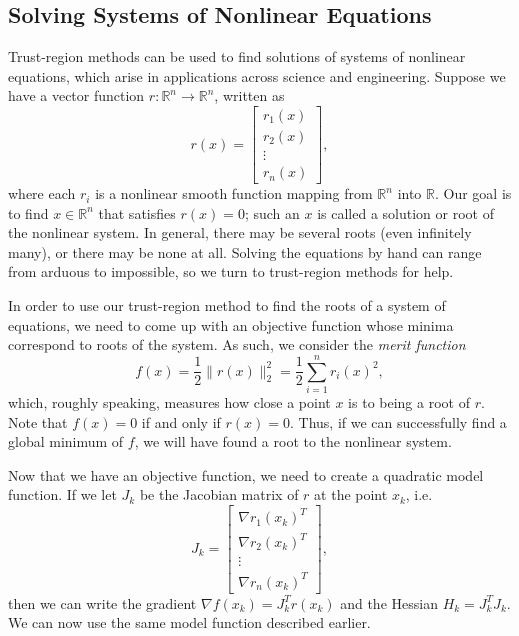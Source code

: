 \subsection*{Solving Systems of Nonlinear Equations}
Trust-region methods can be used to find solutions of systems of nonlinear equations, which arise in applications across science and engineering.
Suppose we have a vector function $r : \mathbb{R}^n \rightarrow \mathbb{R}^n$, written as
\[
r(x) = \begin{bmatrix}
r_1(x)\\
r_2(x)\\
\vdots\\
r_n(x)
\end{bmatrix},
\]
where each $r_i$ is a nonlinear smooth function mapping from $\mathbb{R}^n$ into $\mathbb{R}$.
Our goal is to find $x \in \mathbb{R}^n$ that satisfies $r(x) = 0$; such an $x$ is called a solution
or root of the nonlinear system. In general, there may be several roots (even infinitely many), or there
may be none at all. Solving the equations by hand can range from arduous to impossible, so we turn
to trust-region methods for help.

In order to use our trust-region method to find the roots of a system
of equations, we need to come up with an objective function whose minima correspond to roots of the
system. As such, we consider the \emph{merit function}
\[
f(x) = \frac{1}{2}\|r(x)\|_2^2 = \frac{1}{2}\sum_{i=1}^nr_i(x)^2,
\]
which, roughly speaking, measures how close a point $x$ is to being a root of $r$. Note that $f(x) = 0$
if and only if $r(x) = 0$. Thus, if we can successfully find a global minimum of $f$, we will have
found a root to the nonlinear system.

Now that we have an objective function, we need to create a quadratic model function. If we let
$J_k$ be the Jacobian matrix of $r$ at the point $x_k$, i.e.
\[
J_k = \begin{bmatrix}
\nabla r_1(x_k)^T\\
\nabla r_2(x_k)^T\\
\vdots\\
\nabla r_n(x_k)^T
\end{bmatrix},
\]
then we can write the gradient $\nabla f(x_k) = J_k^Tr(x_k)$ and the Hessian $H_k = J_k^TJ_k$.
We can now use the same model function described earlier.

